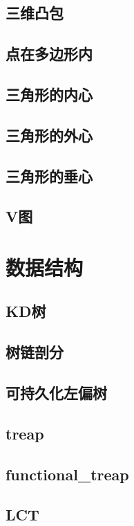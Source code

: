 \documentclass[a4paper,10pt]{book}
\begin{document}
	\section{三维凸包}
		
	\section{点在多边形内}
		
	\section{三角形的内心}
		
	\section{三角形的外心}
		
	\section{三角形的垂心}
		
	\section{V图}
		
\chapter{数据结构}
	\section{KD树}
		
	\section{树链剖分}
		
	\section{可持久化左偏树}
		
	\section{treap}
		
	\section{functional\_treap}
		
	\section{LCT}
		
\end{document}
